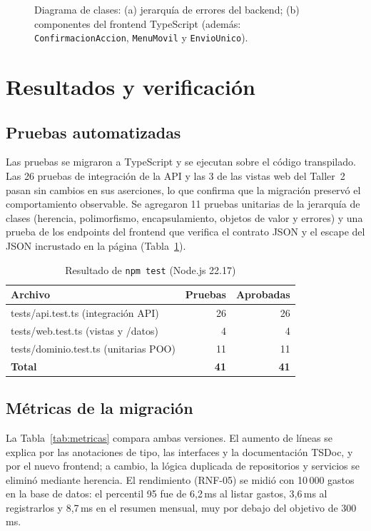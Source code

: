 \documentclass[conference,a4paper]{IEEEtran}
\begin{document}
\begin{figure}[!t]
\centering
\resizebox{\textwidth}{!}{}
\caption{Diagrama de clases: (a) jerarquía de errores del backend; (b) componentes del frontend TypeScript (además: \texttt{ConfirmacionAccion}, \texttt{MenuMovil} y \texttt{EnvioUnico}).}
\label{fig:clases-err}
\end{figure}

\section{Resultados y verificación}\label{sec:resultados}
\subsection{Pruebas automatizadas}
Las pruebas se migraron a TypeScript y se ejecutan sobre el código transpilado. Las 26 pruebas de integración de la API y las 3 de las vistas web del Taller~2 pasan sin cambios en sus aserciones, lo que confirma que la migración preservó el comportamiento observable. Se agregaron 11 pruebas unitarias de la jerarquía de clases (herencia, polimorfismo, encapsulamiento, objetos de valor y errores) y una prueba de los endpoints del frontend que verifica el contrato JSON y el escape del JSON incrustado en la página (Tabla~\ref{tab:pruebas}).

\begin{table}[!t]
\centering
\caption{Resultado de \texttt{npm test} (Node.js 22.17)}
\label{tab:pruebas}
\footnotesize
\begin{tabular}{@{}lrr@{}}
\toprule
\textbf{Archivo} & \textbf{Pruebas} & \textbf{Aprobadas} \\
\midrule
tests/api.test.ts (integración API) & 26 & 26 \\
tests/web.test.ts (vistas y /datos) & 4 & 4 \\
tests/dominio.test.ts (unitarias POO) & 11 & 11 \\
\midrule
\textbf{Total} & \textbf{41} & \textbf{41} \\
\bottomrule
\end{tabular}
\end{table}

\subsection{Métricas de la migración}
La Tabla~\ref{tab:metricas} compara ambas versiones. El aumento de líneas se explica por las anotaciones de tipo, las interfaces y la documentación TSDoc, y por el nuevo frontend; a cambio, la lógica duplicada de repositorios y servicios se eliminó mediante herencia. El rendimiento (RNF-05) se midió con 10\,000 gastos en la base de datos: el percentil 95 fue de 6,2\,ms al listar gastos, 3,6\,ms al registrarlos y 8,7\,ms en el resumen mensual, muy por debajo del objetivo de 300\,ms.
\end{document}
